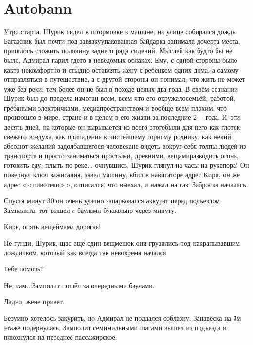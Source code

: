 \chapter{Autobann}
\vepsianrose

Утро старта. Шурик сидел в штормовке в машине, на улице собирался дождь. Багажник был почти под завязку\mdash упакованная байдарка занимала дочерта места, пришлось сложить половину заднего ряда сидений. Мыслей как будто бы не было, Адмирал парил где\sdash то в неведомых облаках. Ему, с одной стороны было как\sdash то некомфортно и стыдно оставлять жену с ребёнком одних дома, а самому отправляться в путешествие, а с другой стороны он понимал, что жить не может уже без реки, тем более он не был в походе целых два года. В своём сознании Шурик был до предела измотан всем, всем что его окружало\mdash семьёй, работой, грёбаными электричками, медиапространством и вообще всем плохим, что произошло в мире, стране и в целом в его жизни за последние 2\thinspace--- года. И~эти десять дней, на которые он вырывается из всего этого\mdash были для него как глоток свежего воздуха, как припадение к чистейшему горному роднику, как некий абсолют желаний задолбавшегося человека\mdash не видеть вокруг себя толпы людей из транспорта и просто заниматься простыми, древними, вещами\mdash разводить огонь, готовить еду, плыть по реке$\ldots$ очнувшись, Шурик глянул на часы на руке\mdash пора! Он повернул ключ зажигания, завёл машину, вбил в навигаторе адрес Кири, он же адрес <<пивотеки>>, отписался, что выехал, и нажал на газ. Заброска началась.

Спустя минут 30 он очень удачно запарковался аккурат перед подъездом Замполита, тот вышел c баулами буквально через минуту.

\diagdash Кирь, опять вещей\mdash мама дорогая!

\diagdash Не гунди, Шурик, щас ещё один вещмешок.\mdash они грузились под накрапывавшим дождичком, который как всегда так невовремя начался.

\diagdash Тебе помочь?

\diagdash Не, сам$\ldots$\mdash Замполит пошёл за очередными баулами.

\diagdash Ладно, жене привет.

Безумно хотелось закурить, но Адмирал не поддался соблазну. Занавеска на 3\sdash м этаже подёрнулась. Замполит семимильными шагами вышел из подъезда и плюхнулся на переднее пассажирское:

